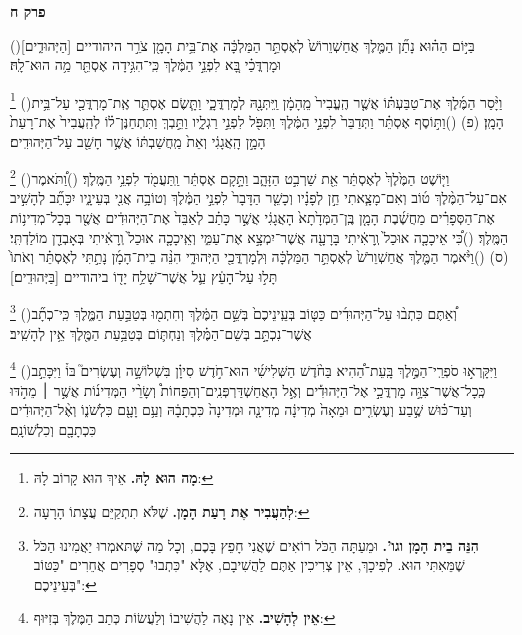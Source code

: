 \documentclass[12pt, openany]{book}
\newcommand{\chapname}{}
\newcommand{\newchap}[1]{
	\addcontentsline{toc}{chapter}{#1}
	\renewcommand{\chapname}{#1}
		\begin{center}
			\textbf{%
\fontsize{16pt}{16pt}\selectfont
				#1}
		\end{center}
}
\newcommand{\footnotecomment}[1]{
	\renewcommand\thefootnote{}
	\footnote{\textsf{#1}}}
\newcommand{\commenta}[1]{\footnotecomment{#1}\hspace{0em}}
\newcommand{\vsnum}[1]{(\hebrewnumeral{#1})\space}
\begin{document}
\newchap{פרק ח}
\begin{multicols}{2}
\vsnum{1}בַּיּ֣וֹם הַה֗וּא נָתַ֞ן הַמֶּ֤לֶךְ אֲחַשְׁוֵרוֹשׁ֙ לְאֶסְתֵּ֣ר הַמַּלְכָּ֔ה אֶת־בֵּ֥ית הָמָ֖ן צֹרֵ֣ר היהודיים [הַיְּהוּדִ֑ים] וּמָרְדֳּכַ֗י בָּ֚א לִפְנֵ֣י הַמֶּ֔לֶךְ כִּֽי־הִגִּ֥ידָה אֶסְתֵּ֖ר מַ֥ה הוּא־לָֽהּ׃%
\commenta{\textrm{\textbf{מָה הוּא לָהּ.}} אֵיךְ הוּא קָרוֹב לָהּ:}%
\vsnum{2}וַיָּ֨סַר הַמֶּ֜לֶךְ אֶת־טַבַּעְתּ֗וֹ אֲשֶׁ֤ר הֶֽעֱבִיר֙ מֵֽהָמָ֔ן וַֽיִּתְּנָ֖הּ לְמָרְדֳּכָ֑י וַתָּ֧שֶׂם אֶסְתֵּ֛ר אֶֽת־מָרְדֳּכַ֖י עַל־בֵּ֥ית הָמָֽן׃ (פ)
\vsnum{3}וַתּ֣וֹסֶף אֶסְתֵּ֗ר וַתְּדַבֵּר֙ לִפְנֵ֣י הַמֶּ֔לֶךְ וַתִּפֹּ֖ל לִפְנֵ֣י רַגְלָ֑יו וַתֵּ֣בְךְּ וַתִּתְחַנֶּן־ל֗וֹ לְהַֽעֲבִיר֙ אֶת־רָעַת֙ הָמָ֣ן הָֽאֲגָגִ֔י וְאֵת֙ מַֽחֲשַׁבְתּ֔וֹ אֲשֶׁ֥ר חָשַׁ֖ב עַל־הַיְּהוּדִֽים׃%
\commenta{\textrm{\textbf{לְהַעֲבִיר אֶת רָעַת הָמָן.}} שֶׁלֹּא תִתְקַיֵּם עֲצָתוֹ הָרָעָה:}%
\vsnum{4}וַיּ֤וֹשֶׁט הַמֶּ֙לֶךְ֙ לְאֶסְתֵּ֔ר אֵ֖ת שַׁרְבִ֣ט הַזָּהָ֑ב וַתָּ֣קָם אֶסְתֵּ֔ר וַֽתַּעֲמֹ֖ד לִפְנֵ֥י הַמֶּֽלֶךְ׃
\vsnum{5}וַ֠תֹּאמֶר אִם־עַל־הַמֶּ֨לֶךְ ט֜וֹב וְאִם־מָצָ֧אתִי חֵ֣ן לְפָנָ֗יו וְכָשֵׁ֤ר הַדָּבָר֙ לִפְנֵ֣י הַמֶּ֔לֶךְ וְטוֹבָ֥ה אֲנִ֖י בְּעֵינָ֑יו יִכָּתֵ֞ב לְהָשִׁ֣יב אֶת־הַסְּפָרִ֗ים מַחֲשֶׁ֜בֶת הָמָ֤ן בֶּֽן־הַמְּדָ֙תָא֙ הָאֲגָגִ֔י אֲשֶׁ֣ר כָּתַ֗ב לְאַבֵּד֙ אֶת־הַיְּהוּדִ֔ים אֲשֶׁ֖ר בְּכָל־מְדִינ֥וֹת הַמֶּֽלֶךְ׃
\vsnum{6}כִּ֠י אֵיכָכָ֤ה אוּכַל֙ וְֽרָאִ֔יתִי בָּרָעָ֖ה אֲשֶׁר־יִמְצָ֣א אֶת־עַמִּ֑י וְאֵֽיכָכָ֤ה אוּכַל֙ וְֽרָאִ֔יתִי בְּאָבְדַ֖ן מוֹלַדְתִּֽי׃ (ס)
\vsnum{7}וַיֹּ֨אמֶר הַמֶּ֤לֶךְ אֲחַשְׁוֵרֹשׁ֙ לְאֶסְתֵּ֣ר הַמַּלְכָּ֔ה וּֽלְמָרְדֳּכַ֖י הַיְּהוּדִ֑י הִנֵּ֨ה בֵית־הָמָ֜ן נָתַ֣תִּי לְאֶסְתֵּ֗ר וְאֹתוֹ֙ תָּל֣וּ עַל־הָעֵ֔ץ עַ֛ל אֲשֶׁר־שָׁלַ֥ח יָד֖וֹ ביהודיים [בַּיְּהוּדִֽים׃]%
\commenta{\textrm{\textbf{הִנֵּה בֵית הָמָן וגו'.}} וּמֵעַתָּה הַכֹּל רוֹאִים שֶׁאֲנִי חָפֵץ בָּכֶם, וְכָל מַה שֶּׁתּאמְרוּ יַאֲמִינוּ הַכֹּל שֶׁמֵּאִתִּי הוּא. לְפִיכָךְ, אֵין צְרִיכִין אַתֶּם לַהֲשִׁיבָם, אֶלָּא "כִּתְבוּ" סְפָרִים אֲחֵרִים "כַּטּוֹב בְּעֵינֵיכֶם": }%
\vsnum{8}וְ֠אַתֶּם כִּתְב֨וּ עַל־הַיְּהוּדִ֜ים כַּטּ֤וֹב בְּעֵֽינֵיכֶם֙ בְּשֵׁ֣ם הַמֶּ֔לֶךְ וְחִתְמ֖וּ בְּטַבַּ֣עַת הַמֶּ֑לֶךְ כִּֽי־כְתָ֞ב אֲשֶׁר־נִכְתָּ֣ב בְּשֵׁם־הַמֶּ֗לֶךְ וְנַחְתּ֛וֹם בְּטַבַּ֥עַת הַמֶּ֖לֶךְ אֵ֥ין לְהָשִֽׁיב׃%
\commenta{\textrm{\textbf{אֵין לְהָשִׁיב.}} אֵין נָאֶה לַהֲשִׁיבוֹ וְלַעֲשׂוֹת כְּתַב הַמֶּלֶךְ בְּזִיּוּף:}%
\vsnum{9}וַיִּקָּרְא֣וּ סֹפְרֵֽי־הַמֶּ֣לֶךְ בָּֽעֵת־הַ֠הִיא בַּחֹ֨דֶשׁ הַשְּׁלִישִׁ֜י הוּא־חֹ֣דֶשׁ סִיוָ֗ן בִּשְׁלוֹשָׁ֣ה וְעֶשְׂרִים֮ בּוֹ֒ וַיִּכָּתֵ֣ב כְּֽכָל־אֲשֶׁר־צִוָּ֣ה מָרְדֳּכַ֣י אֶל־הַיְּהוּדִ֡ים וְאֶ֣ל הָאֲחַשְׁדַּרְפְּנִֽים־וְהַפַּחוֹת֩ וְשָׂרֵ֨י הַמְּדִינ֜וֹת אֲשֶׁ֣ר ׀ מֵהֹ֣דּוּ וְעַד־כּ֗וּשׁ שֶׁ֣בַע וְעֶשְׂרִ֤ים וּמֵאָה֙ מְדִינָ֔ה מְדִינָ֤ה וּמְדִינָה֙ כִּכְתָבָ֔הּ וְעַ֥ם וָעָ֖ם כִּלְשֹׁנ֑וֹ וְאֶ֨ל־הַיְּהוּדִ֔ים כִּכְתָבָ֖ם וְכִלְשׁוֹנָֽם׃%

\end{multicols}
\end{document}
